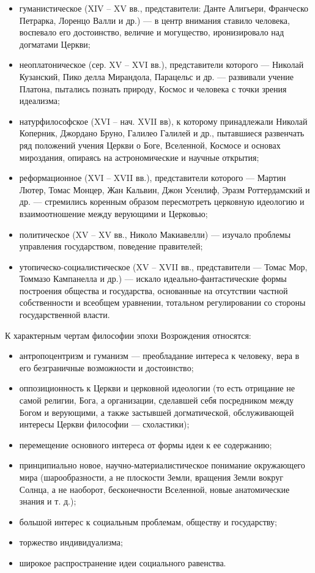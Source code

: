 \documentclass[12pt]{article}
\begin{document}
  \begin{itemize}
    \item гуманистическое (XIV -- XV вв., представители: Данте Алигьери, Франческо Петрарка, Лоренцо Валли и др.)
      --- в центр внимания ставило человека,
      воспевало его достоинство, величие и могущество, иронизировало над
догматами Церкви;
\item неоплатоническое (сер. XV -- XVI вв.), представители которого --- Николай Кузанский, Пико делла Мирандола,
Парацельс и др. --- развивали учение Платона, пытались познать природу, Космос и человека с точки зрения
идеализма;
\item натурфилософское (XVI -- нач. XVII вв), к которому принадлежали Николай Коперник, Джордано Бруно,
Галилео Галилей и др., пытавшиеся развенчать ряд положений учения Церкви о Боге, Вселенной, Космосе и
основах мироздания, опираясь на астрономические и научные открытия;
\item реформационное (XVI -- XVII вв.), представители которого --- Мартин Лютер, Томас Монцер,
  Жан Кальвин,
Джон  Усенлиф,  Эразм  Роттердамский  и  др.  ---  стремились  коренным  образом  пересмотреть  церковную
идеологию и взаимоотношение между верующими и Церковью;
\item политическое (XV -- XV вв., Николо Макиавелли) --- изучало проблемы управления государством, поведение
правителей;
\item утопическо-социалистическое (XV -- XVII вв., представители --- Томас Мор, Томмазо Кампанелла и др.) 
 --- искало
идеально-фантастические  формы  построения  общества  и  государства,  основанные  на  отсутствии  частной
собственности и всеобщем уравнении, тотальном регулировании со стороны государственной власти.
\end{itemize}
К характерным чертам философии эпохи Возрождения относятся: 
\begin{itemize}
  \item антропоцентризм и гуманизм --- преобладание интереса к человеку, вера в его безграничные возможности и
достоинство;
\item оппозиционность к Церкви и церковной идеологии (то есть отрицание не самой религии, Бога, а организации,
сделавшей себя посредником между Богом и верующими, а также застывшей догматической, обслуживающей
интересы Церкви философии --- схоластики);
\item перемещение основного интереса от формы идеи к ее содержанию;
\item  принципиально  новое,  научно-материалистическое  понимание  окружающего  мира  (шарообразности,  а  не
плоскости  Земли,  вращения  Земли  вокруг  Солнца,  а  не  наоборот,  бесконечности  Вселенной,  новые
анатомические знания и т. д.);
\item большой интерес к социальным проблемам, обществу и государству;
\item торжество индивидуализма;
\item широкое распространение идеи социального равенства.
\end{itemize}
\end{document}
